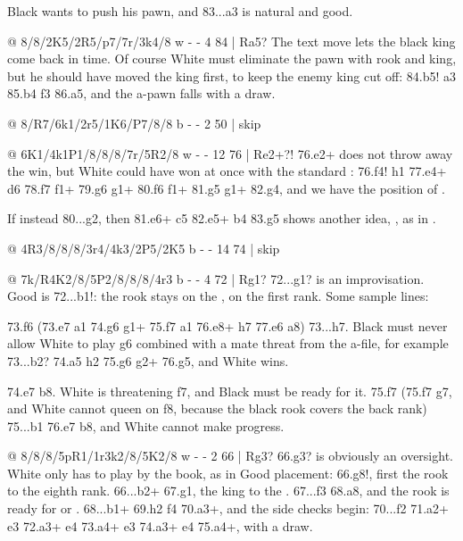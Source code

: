 Black wants to push his pawn, and 83...a3 is natural and good.

@ 8/8/2K5/2R5/p7/7r/3k4/8 w - - 4 84 | Ra5?
The text move lets the black king come back in time. Of course White must eliminate the pawn with
rook and king, but he should have moved the king first, to keep the enemy king cut off: 84.\K b5!
a3 85.\K b4 \R f3 86.\R a5, and the a-pawn falls with a draw.

@ 8/R7/6k1/2r5/1K6/P7/8/8 b - - 2 50 | skip

@ 6K1/4k1P1/8/8/8/7r/5R2/8 w - - 12 76 | Re2+?!
76.\R e2+ does not throw away the win, but White could have won at once with the standard
: 76.\R f4! \R h1 77.\R e4+ \K d6 78.\K f7
\R f1+ 79.\K g6 \R g1+ 80.\K f6 \R f1+ 81.\K g5 \R g1+ 82.\R g4, and we have the position of
.

If instead 80...\R g2, then 81.\R e6+ \K c5 82.\R e5+ \K b4 83.\R g5 shows another idea,
, as in .

@ 4R3/8/8/8/3r4/4k3/2P5/2K5 b - - 14 74 | skip

@ 7k/R4K2/8/5P2/8/8/8/4r3 b - - 4 72 | Rg1?
72...\R g1? is an improvisation. Good is
72...\R b1!: the rook stays on the , on the first rank. Some sample lines:

73.f6 (73.\R e7 \R a1 74.\K g6 \R g1+ 75.\K f7 \R a1 76.\R e8+ \K h7 77.\R e6 \R a8) 73...\K h7.
Black must never allow White to play \K g6 combined with a mate threat from the a-file, for
example 73...\R b2? 74.\R a5 \R h2 75.\K g6 \R g2+ 76.\R g5, and White wins.

74.\K e7 \R b8. White is threatening f7, and Black must be ready for it. 75.\K f7 (75.f7 \K g7,
and White cannot queen on f8, because the black rook covers the back rank) 75...\R b1 76.\R e7
\R b8, and White cannot make progress.

@ 8/8/8/5pR1/1r3k2/8/5K2/8 w - - 2 66 | Rg3?
66.\R g3? is obviously an oversight. White only has to play by the book, as in
Good placement: 66.\R g8!, first the rook
to the eighth rank. 66...\R b2+ 67.\K g1, the king to the . 67...\K f3 68.\R a8,
and the rook is ready for  or . 68...\R b1+ 69.\K h2 f4
70.\R a3+, and the side checks begin: 70...\K f2 71.\R a2+ \K e3
72.\R a3+ \K e4 73.\R a4+ \K e3 74.\R a3+ \K e4 75.\R a4+, with a draw.

